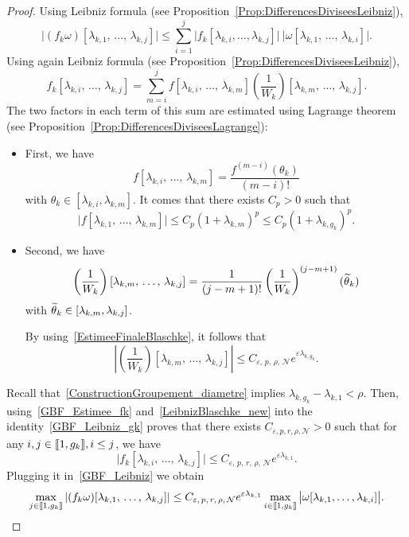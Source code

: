 \documentclass[AHL,Unicode,longabstracts]{cedram}
\newcommand{\llbracket}{\mathopen{[\mkern -2.7mu[}}
\newcommand{\rrbracket}{\mathclose{]\mkern -2.7mu]}}
\newcommand{\inter}[2]{\llbracket #1,#2 \rrbracket}
\newcommand{\n}{g}
\newcommand{\NN}{\mathcal{N}}
\let\oldtilde\tilde
\renewcommand*{\tilde}[1]{\mathchoice{\widetilde{#1}}{\widetilde{#1}}{\oldtilde{#1}}{\oldtilde{#1}}}\let\oldexists\exists
\renewcommand*{\exists}{\mathrel{\oldexists}}
\begin{document}
\begin{proof}
Using Leibniz formula (see Proposition~\ref{Prop:DifferencesDiviseesLeibniz}),
\begin{equation}\label{GBF_Leibniz}
\big| (f_k \omega) [\lambda_{k,1},\,\dots,\, \lambda_{k,j}] \big|
\leq \sum_{i=1}^j \big| f_k[\lambda_{k,i},\dots,\lambda_{k,j}] \big| \: \big| \omega[\lambda_{k,1},\,\dots,\,\lambda_{k,i}] \big|.
\end{equation}
Using again Leibniz formula (see Proposition~\ref{Prop:DifferencesDiviseesLeibniz}),
\begin{equation}\label{GBF_Leibniz_gk}
f_k[\lambda_{k,i},\,\dots,\,\lambda_{k,j}] = \sum_{m=i}^j f[\lambda_{k,i},\,\dots,\,\lambda_{k,m}] \left(\frac{1}{W_k} \right)[\lambda_{k,m},\,\dots,\,\lambda_{k,j}].
\end{equation}
The two factors in each term of this sum are estimated using Lagrange theorem (see Proposition~\ref{Prop:DifferencesDiviseesLagrange}):
\begin{itemize}
\item First, we have
\[
f[\lambda_{k,i},\,\dots,\,\lambda_{k,m}] = \frac{f^{(m-i)}(\theta_k)}{(m-i)!}
\]
with $\theta_k \in [\lambda_{k,i}, \lambda_{k,m}]$. It comes that there exists $C_p>0$ such that
\begin{equation}\label{GBF_Estimee_fk}
\big| f[\lambda_{k,1},\,\dots,\,\lambda_{k,m}] \big| \leq C_p (1+\lambda_{k,m})^p \leq C_p (1+\lambda_{k,\n_k})^p.
\end{equation}
\item Second, we have
\begin{equation*}
\left(\frac{1}{W_k} \right)[\lambda_{k,m},\, \dots,\,\lambda_{k,j}] = \frac{1}{(j-m+1)!} \left(\frac{1}{W_k} \right)^{(j-m+1)}(\tilde{\theta}_k)
\end{equation*}
with $\tilde{\theta}_k \in [\lambda_{k,m},\lambda_{k,j}]$.


By using~\eqref{EstimeeFinaleBlaschke}, it follows that
\begin{equation}\label{LeibnizBlaschke_new}
\left|\left(\frac{1}{W_k} \right)[\lambda_{k,m},\,\dots,\,\lambda_{k,j}]\right| \leq C_{\varepsilon,\,p,\, \rho,\, \NN} e^{\varepsilon \lambda_{k,\n_k}}.
\end{equation}
\end{itemize}


Recall that~\eqref{ConstructionGroupement_diametre} implies $\lambda_{k,\n_k} - \lambda_{k,1} < \rho$. Then, using~\eqref{GBF_Estimee_fk} and~\eqref{LeibnizBlaschke_new} into the identity~\eqref{GBF_Leibniz_gk} proves that there exists $C_{\varepsilon, p, r, \rho, \NN}>0$ such that for any $i,j\in \inter{1}{\n_k}, i\leq j$, we have
\[
\big| f_k[\lambda_{k,i},\,\dots,\, \lambda_{k,j}] \big| \leq C_{\varepsilon,\, p,\, r,\, \rho,\, \NN} e^{\varepsilon \lambda_{k,1}}.
\]
Plugging it in~\eqref{GBF_Leibniz} we obtain
\[
\max_{j\in \inter{1}{\n_k}} \left| (f_k \omega) [\lambda_{k,1},\,\dots,\, \lambda_{k,j}] \right| \leq C_{\varepsilon,\, p,\, r,\, \rho,\, \NN} e^{\varepsilon \lambda_{k,1}} \max \limits_{i\in \inter{1}{\n_k}} \big| \omega[\lambda_{k,1}, \dots, \lambda_{k,i}] \big|.
\]


\end{proof}
\end{document}
